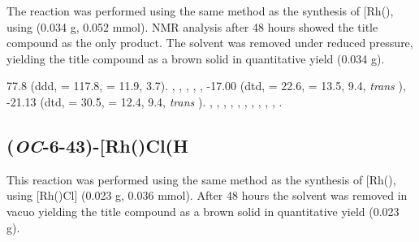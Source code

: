 
The reaction was performed using the same method as the synthesis of [Rh(\tBusixantphos)\ce{Cl(H)2]}, using \tButhixantphos{} (0.034 g, 0.052 mmol).  NMR analysis after 48 hours showed the title compound as the only product.  The solvent was removed under reduced pressure, yielding the title compound as a brown solid in quantitative yield (0.034 g).  

77.8 (ddd, \JRhP{} = 117.8, \JPH{} = 11.9, 3.7).
,
,
,
,
,
-17.00 (dtd, \JRhH{} = 22.6, \JPH{} = 13.5, \JHH{} 9.4,  \emph{trans} ),
-21.13 (dtd, \JRhH{} = 30.5, \JPH{} = 12.4, \JHH{} 9.4,  \emph{trans} ).
,
,
,
,
,
,
,
,
,
,
.

 
\subsection*{(\emph{OC}-6-43)-\texorpdfstring{[Rh(\tBuxantphosk)Cl(H\ce{)2]}} R}


This reaction was performed using the same method as the synthesis of [Rh(\tBusixantphos)\ce{Cl(H)2]}, using [Rh(\tBuxantphos)Cl] (0.023 g, 0.036 mmol).  After 48 hours the solvent was removed in vacuo yielding the title compound as a brown solid in quantitative yield (0.023 g).

